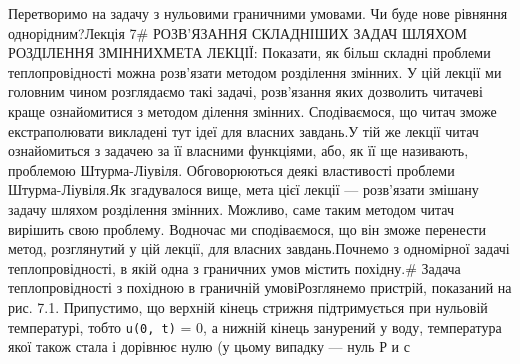 \documentclass[
  ukrainian,
]{article}
\begin{document}
Перетворимо на задачу з нульовими граничними умовами. Чи буде нове
рівняння однорідним?Лекція 7\# РОЗВ'ЯЗАННЯ СКЛАДНІШИХ ЗАДАЧ ШЛЯХОМ
РОЗДІЛЕННЯ ЗМІННИХМЕТА ЛЕКЦІЇ: Показати, як більш складні проблеми
теплопровідності можна розв'язати методом розділення змінних. У цій
лекції ми головним чином розглядаємо такі задачі, розв'язання яких
дозволить читачеві краще ознайомитися з методом ділення змінних.
Сподіваємося, що читач зможе екстраполювати викладені тут ідеї для
власних завдань.У тій же лекції читач ознайомиться з задачею за її
власними функціями, або, як її ще називають, проблемою Штурма-Ліувіля.
Обговорюються деякі властивості проблеми Штурма-Ліувіля.Як згадувалося
вище, мета цієї лекції --- розв'язати змішану задачу шляхом розділення
змінних. Можливо, саме таким методом читач вирішить свою проблему.
Водночас ми сподіваємося, що він зможе перенести метод, розглянутий у
цій лекції, для власних завдань.Почнемо з одномірної задачі
теплопровідності, в якій одна з граничних умов містить похідну.\# Задача
теплопровідності з похідною в граничній умовіРозглянемо пристрій,
показаний на рис. 7.1. Припустимо, що верхній кінець стрижня
підтримується при нульовій температурі, тобто \texttt{u(0,\ t)} = 0, а
нижній кінець занурений у воду, температура якої також стала і дорівнює
нулю (у цьому випадку --- нуль Р и с
\end{document}
